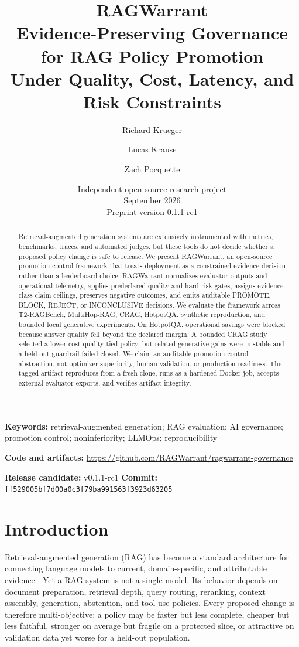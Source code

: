 \documentclass[11pt]{article}
\title{\textbf{RAGWarrant}\\[0.4em]
\large Evidence-Preserving Governance for RAG Policy Promotion\\
Under Quality, Cost, Latency, and Risk Constraints}
\author{Richard Krueger \and Lucas Krause \and Zach Pocquette}
\date{Independent open-source research project\\September 2026\\Preprint version 0.1.1-rc1}
\begin{document}
\maketitle

\begin{abstract}
Retrieval-augmented generation systems are extensively instrumented with metrics, benchmarks, traces, and automated judges, but these tools do not decide whether a proposed policy change is safe to release. We present RAGWarrant, an open-source promotion-control framework that treats deployment as a constrained evidence decision rather than a leaderboard choice. RAGWarrant normalizes evaluator outputs and operational telemetry, applies predeclared quality and hard-risk gates, assigns evidence-class claim ceilings, preserves negative outcomes, and emits auditable PROMOTE, BLOCK, REJECT, or INCONCLUSIVE decisions. We evaluate the framework across T2-RAGBench, MultiHop-RAG, CRAG, HotpotQA, synthetic reproduction, and bounded local generative experiments. On HotpotQA, operational savings were blocked because answer quality fell beyond the declared margin. A bounded CRAG study selected a lower-cost quality-tied policy, but related generative gains were unstable and a held-out guardrail failed closed. We claim an auditable promotion-control abstraction, not optimizer superiority, human validation, or production readiness. The tagged artifact reproduces from a fresh clone, runs as a hardened Docker job, accepts external evaluator exports, and verifies artifact integrity.
\end{abstract}

\noindent\textbf{Keywords:} retrieval-augmented generation; RAG evaluation; AI governance; promotion control; noninferiority; LLMOps; reproducibility

\medskip
\noindent\textbf{Code and artifacts:} \url{https://github.com/RAGWarrant/ragwarrant-governance}

\noindent\textbf{Release candidate:} v0.1.1-rc1 \quad \textbf{Commit:} \texttt{ff529005bf7d00a0c3f79ba991563f3923d63205}

\section{Introduction}\label{sec:introduction}

Retrieval-augmented generation (RAG) has become a standard architecture
for connecting language models to current, domain-specific, and
attributable evidence \cite{lewis2020rag,gao2023survey}. Yet a RAG system is not a single
model. Its behavior depends on document preparation, retrieval depth,
query routing, reranking, context assembly, generation, abstention, and
tool-use policies. Every proposed change is therefore multi-objective: a
policy may be faster but less complete, cheaper but less faithful,
stronger on average but fragile on a protected slice, or attractive on
validation data yet worse for a held-out population.
\end{document}
